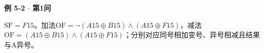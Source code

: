 {\color{ink}\bfseries 例 5-2 \(\cdot \) 第1问}\par\vspace{1bp}\(\mathrm{SF}=\allowbreak{}F15\)。加法\(\mathrm{OF}=\allowbreak{}\neg (A15\oplus B15)\land (A15\oplus F15)\)，减法\(\mathrm{OF}=\allowbreak{}(A15\oplus B15)\land (A15\oplus F15)\)；分别对应同号相加变号、异号相减且结果与A异号。
